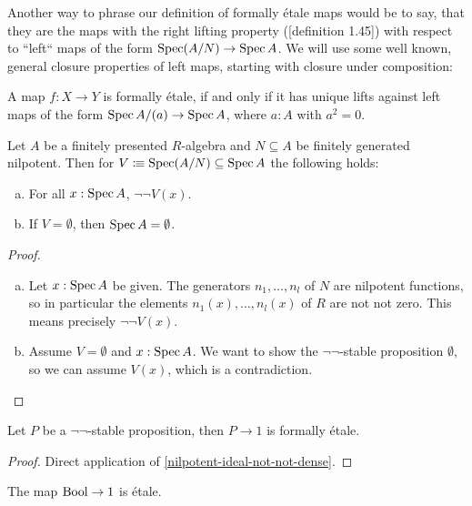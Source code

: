 Another way to phrase our definition of formally étale maps would be to say,
that they are the maps with the right lifting property (\cite{modalities}[definition 1.45]) with respect to ``left`` maps of the form $\operatorname{Spec} (A/N)\to \operatorname{Spec} A$.
We will use some well known, general closure properties of left maps, starting with closure under composition:

\begin{lemma}%
  A map $f:X\to Y$ is formally étale,
  if and only if it has unique lifts against left maps of the form $\operatorname{Spec} A/(a)\to \operatorname{Spec} A$,
  where $a:A$ with $a^2=0$.
\end{lemma}

\begin{lemma}%
  \label{nilpotent-ideal-not-not-dense}
  Let $A$ be a finitely presented $R$-algebra and $N\subseteq A$ be finitely generated nilpotent.
  Then for $V\vcentcolon\mspace{-1.2mu}\equiv \operatorname{Spec} (A/N)\subseteq \operatorname{Spec} A$ the following holds:
  \begin{enumerate}[(a)]
  \item For all $x:\operatorname{Spec} A$, $\neg\neg V(x)$.
  \item If $V=\emptyset$, then $\operatorname{Spec} A=\emptyset$.
  \end{enumerate}
\end{lemma}

\begin{proof}
  \begin{enumerate}[(a)]
  \item
    Let $x : \operatorname{Spec} A$ be given.
    The generators $n_1,\dots,n_l$ of $N$ are nilpotent functions,
    so in particular the elements $n_1(x), \dots, n_l(x)$ of $R$
    are not not zero.
    This means precisely $\neg\neg V(x)$.
  \item Assume $V=\emptyset$ and $x:\operatorname{Spec} A$.
        We want to show the $\neg\neg$-stable proposition $\emptyset$,
        so we can assume $V(x)$, which is a contradiction.
  \end{enumerate}
\end{proof}

\begin{proposition}%
  Let $P$ be a $\neg\neg$-stable proposition,
  then $P\to 1$ is formally étale.
\end{proposition}

\begin{proof}
  Direct application of \cref{nilpotent-ideal-not-not-dense}.
\end{proof}

\begin{proposition}%
  The map $\mathrm{Bool}\to 1$ is étale.
\end{proposition}


